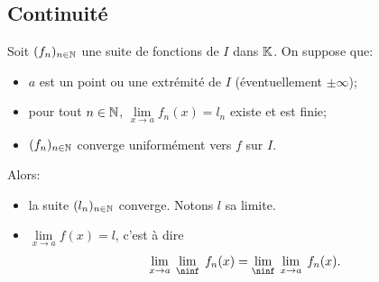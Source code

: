 \documentclass{book}
\newcommand{\fn}{(f_n)_{n\in \N   }}
\begin{document}
\subsection{Continuité}\label{sec:cont}
\begin{Theoreme}
Soit $\fn$ une suite de fonctions de $I$ dans $\mathbb{K}  $.
On suppose que:
\begin{itemize}
\item
  $a$ est un point ou une extrémité de $I$ (éventuellement $±\infty$);
\item
  pour tout $n\in \mathbb{N}   $, $\lim\limits_{x\to a} f_n(x) = l_n$ existe et est finie;
\item
  $\fn$ converge uniformément vers $f$ sur $I$.
\end{itemize}
Alors:
\begin{itemize}
\item
  la suite $(l_n)_{n\in \mathbb{N}   }$ converge. Notons $l$ sa limite.
\item
  $\lim\limits_{x\to a} f(x) = l$, c'est à dire
  \[ 
      \lim_{x\to a} \; \lim_\ninf \; f_n(x) = \lim_\ninf \; \lim_{x\to a} \; f_n(x).
   \]
\end{itemize}
\end{Theoreme}
%  
\end{document}
